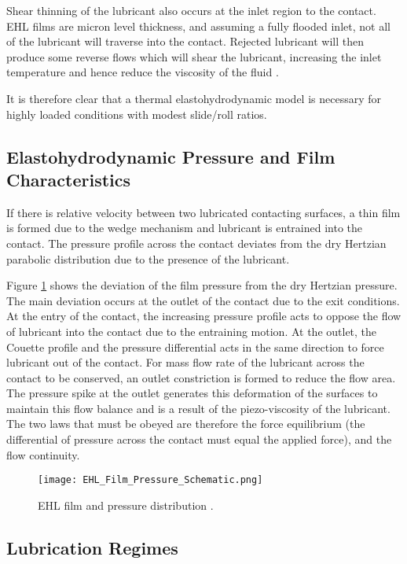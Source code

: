 Shear thinning of the lubricant also occurs at the inlet region to the contact. EHL films are micron level thickness, and assuming a fully flooded inlet, not all of the lubricant will traverse into the contact. Rejected lubricant will then produce some reverse flows which will shear the lubricant, increasing the inlet temperature and hence reduce the viscosity of the fluid \cite{Stribeck1907}.

It is therefore clear that a thermal elastohydrodynamic model is necessary for highly loaded conditions with modest slide/roll ratios.

\subsection{Elastohydrodynamic Pressure and Film Characteristics}

If there is relative velocity between two lubricated contacting surfaces, a thin film is formed due to the wedge mechanism and lubricant is entrained into the contact. The pressure profile across the contact deviates from the dry Hertzian parabolic distribution due to the presence of the lubricant.

Figure \ref{EHL_Film_Pressure_Schematic} shows the deviation of the film pressure from the dry Hertzian pressure. The main deviation occurs at the outlet of the contact due to the exit conditions. At the entry of the contact, the increasing pressure profile acts to oppose the flow of lubricant into the contact due to the entraining motion. At the outlet, the Couette profile and the pressure differential acts in the same direction to force lubricant out of the contact. For mass flow rate of the lubricant across the contact to be conserved, an outlet constriction is formed to reduce the flow area. The pressure spike at the outlet generates this deformation of the surfaces to maintain this flow balance and is a result of the piezo-viscosity of the lubricant. The two laws that must be obeyed are therefore the force equilibrium (the differential of pressure across the contact must equal the applied force), and the flow continuity.

\begin{figure}
	\centerline{\texttt{[image: EHL\_Film\_Pressure\_Schematic.png]}}
	\caption[EHL film and pressure distribution]{EHL film and pressure distribution \cite{Larsson2013}.}
	\label{EHL_Film_Pressure_Schematic}
\end{figure}

\subsection{Lubrication Regimes}

